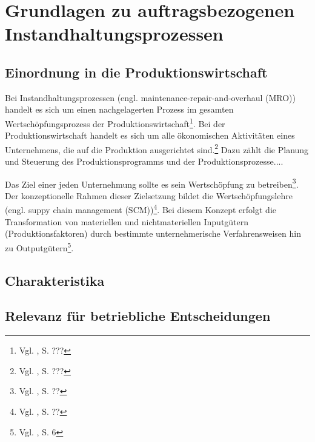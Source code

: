 \chapter{Grundlagen zu auftragsbezogenen Instandhaltungsprozessen}
\setcounter{footnote}{4}  %

\section{Einordnung in die Produktionswirtschaft}

Bei Instandhaltungsprozessen (engl. maintenance-repair-and-overhaul (MRO)) handelt es sich um einen nachgelagerten Prozess im gesamten Wertschöpfungsprozess der Produktionswirtschaft\footnote{Vgl. \cite{???}, S. ???}. Bei der Produktionswirtschaft handelt es sich um alle ökonomischen Aktivitäten eines Unternehmens, die auf die Produktion ausgerichtet sind.\footnote{Vgl. \cite{???}, S. ???} Dazu zählt die Planung und Steuerung des Produktionsprogramms und der Produktionsprozesse....

Das Ziel einer jeden Unternehmung sollte es sein Wertschöpfung zu betreiben\footnote{Vgl. \cite{???}, S. ??}. Der konzeptionelle Rahmen dieser Zielsetzung bildet die Wertschöpfungslehre (engl. suppy chain management (SCM))\footnote{Vgl. \cite{???}, S. ??}. Bei diesem Konzept erfolgt die Transformation von materiellen und nichtmateriellen Inputgütern (Produktionsfaktoren) durch bestimmte unternehmerische Verfahrensweisen hin zu Outputgütern\footnote{Vgl. \cite{tempelmeier1994produktion}, S. 6}.

\section{Charakteristika}

\section{Relevanz für betriebliche Entscheidungen}
